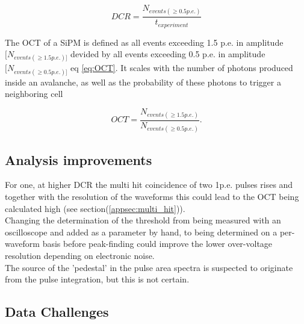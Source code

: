 \documentclass[12pt,article,type=msc,colorback,accentcolor=tud9c]{tudthesis}
\begin{document}
\begin{equation}\label{eq:DCR_eq}
DCR = \frac{N_{events(\geq 0.5p.e.)}}{t_{experiment}}
\end{equation}


The OCT of a SiPM is defined as all events exceeding 1.5 p.e. in amplitude$[N_{events(\geq 1.5p.e.)]}$ devided by all events exceeding 0.5 p.e. in amplitude$[N_{events(\geq 0.5p.e.)]}$ eq \ref{eq:OCT}. It scales with the number of photons produced inside an avalanche, as well as the probability of these photons to trigger a neighboring cell

\begin{equation}\label{eq:OCT}
OCT = \frac{N_{events(\geq 1.5p.e.)}}{N_{events(\geq 0.5p.e.)}}.
\end{equation}

\subsection{Analysis improvements}
For one, at higher DCR the multi hit coincidence of two 1p.e. pulses rises and together with the resolution of the waveforms this could lead to the OCT being calculated high (see section(\ref{appsec:multi_hit})).\\ Changing the determination of the threshold from being measured with an oscilloscope and added as a parameter by hand, to being determined on a per-waveform basis before peak-finding could improve the lower over-voltage resolution depending on electronic noise.\\ The source of the 'pedestal' in the pulse area spectra is suspected to originate from the pulse integration, but this is not certain.


\newpage
\subsection{Data Challenges}
\label{subsec:data_challenges}
\end{document}
